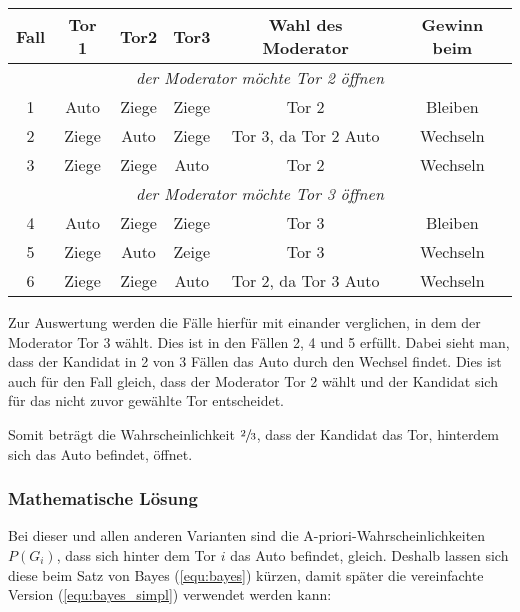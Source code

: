 \begin{tabular}[h]{|c|c|c|c|c|c|}
    \hline
    \textbf{Fall} & \textbf{Tor 1} & \textbf{Tor2} & \textbf{Tor3} & \textbf{Wahl des Moderator} & \textbf{Gewinn beim} \\
    \hline
    \multicolumn{6}{|c|}{\textit{der Moderator möchte Tor 2 öffnen} }                                                   \\
    \hline
    1             & Auto           & Ziege         & Ziege         & Tor 2                       & Bleiben              \\
    2             & Ziege          & Auto          & Ziege         & Tor 3, da Tor 2 Auto        & Wechseln             \\
    3             & Ziege          & Ziege         & Auto          & Tor 2                       & Wechseln             \\
    \hline
    \multicolumn{6}{|c|}{\textit{der Moderator möchte Tor 3 öffnen}
    }                                                                                                                   \\
    \hline
    4             & Auto           & Ziege         & Ziege         & Tor 3                       & Bleiben              \\
    5             & Ziege          & Auto          & Zeige         & Tor 3                       & Wechseln             \\
    6             & Ziege          & Ziege         & Auto          & Tor 2, da Tor 3 Auto        & Wechseln             \\
    \hline
\end{tabular}

Zur Auswertung werden die Fälle hierfür mit einander verglichen, in dem der Moderator Tor 3 wählt. Dies ist in den Fällen 2, 4 und 5 erfüllt.
Dabei sieht man, dass der Kandidat in 2 von 3 Fällen das Auto durch den Wechsel findet. Dies ist auch für den Fall gleich, dass der Moderator Tor 2 wählt und
der Kandidat sich für das nicht zuvor gewählte Tor entscheidet.

Somit beträgt die Wahrscheinlichkeit $\sfrac{2}{3}$, dass der Kandidat das Tor, hinterdem sich das Auto befindet, öffnet.

\subsubsection{Mathematische Lösung}

Bei dieser und allen anderen Varianten sind die A-priori-Wahrscheinlichkeiten $P(G_i)$, dass sich hinter dem Tor $i$ das Auto befindet, gleich. Deshalb lassen sich diese beim Satz von Bayes (\autoref{equ:bayes}) kürzen, damit später die vereinfachte Version (\autoref{equ:bayes_simpl}) verwendet werden kann:

